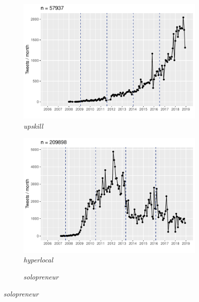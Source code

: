 \documentclass[
  a4paper,
  abstract=on,
  captions=tableabove
  ]{scrartcl}
\begin{document}
  \begin{figure}
    \caption{Temporal dynamics in usage frequency for case studies.}
    \centering
    \begin{subfigure}{.3\linewidth}
      \caption{\emph{upskill}}
      \includegraphics[width=\linewidth, height=.8\textheight, keepaspectratio]{"img/ui_upskill_time"}
    \end{subfigure}
    \begin{subfigure}{.3\linewidth}
      \caption{\emph{hyperlocal}}
      \includegraphics[width=\linewidth, height=.8\textheight, keepaspectratio]{img/ui_hyperlocal_time.pdf}
    \end{subfigure}
    \begin{subfigure}{.3\linewidth}
      \caption{\emph{solopreneur}}

\end{subfigure}
\end{figure}
\end{document}
